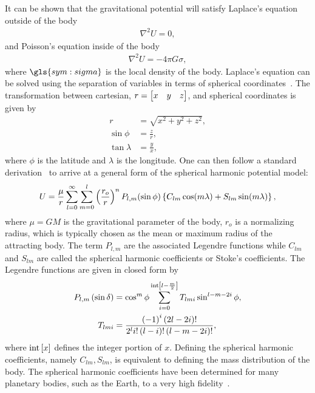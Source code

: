 It can be shown that the gravitational potential will satisfy Laplace's equation outside of the body
\begin{align}\label{eq:laplace_equation}
    \nabla^2 U = 0,
\end{align}
and Poisson's equation inside of the body
\begin{align}\label{eq:poisson_equation}
    \nabla^2 U = - 4 \pi G \sigma,
\end{align}
where \( \gls{sym:sigma} \) is the local density of the body.
Laplace's equation can be solved using the separation of variables in terms of spherical coordinates~\cite{scheeres2012a}.
The transformation between cartesian, \( r = \begin{bmatrix} x & y & z \end{bmatrix}\), and spherical coordinates is given by
\begin{subequations}
    \begin{align*}
        r &= \sqrt{x^2 + y^2 + z^2}, \\
        \sin \phi &= \frac{z}{r}, \\
        \tan \lambda &= \frac{y}{x},
    \end{align*}
\end{subequations}
where \( \phi \) is the latitude and \( \lambda\) is the longitude.
One can then follow a standard derivation~\cite{vallado2007} to arrive at a general form of the spherical harmonic potential model:
\begin{align}\label{eq:spherical_harmonic}
    U = \frac{\mu}{r} \sum_{l=0}^\infty \sum_{m=0}^l \left( \frac{r_o}{r} \right)^n P_{l, m}(\sin \phi) \left\{  C_{lm} \cos(m \lambda) + S_{lm} \sin(m \lambda) \right\},
\end{align}
where \( \mu = G M \) is the gravitational parameter of the body, \( r_o\) is a normalizing radius, which is typically chosen as the mean or maximum radius of the attracting body.
The term \( P_{l, m} \) are the associated Legendre functions while \( C_{lm}\) and \( S_{lm}\) are called the spherical harmonic coefficients or Stoke's coefficients. 
The Legendre functions are given in closed form by~\cite{scheeres2012}
\begin{subequations}
\begin{align}
    P_{l, m} \left(  \sin \delta \right) &= \cos^m \phi \sum_{i = 0}^{\text{int}\left[ l - \frac{m}{2} \right]} T_{lmi} \sin^{l - m - 2i} \phi ,  \\
T_{lmi} &= \frac{\left( -1 \right)^i\left( 2l - 2i \right)!}{2^l i! \left( l - i \right)!\left( l - m- 2i \right)!},
\end{align}
\end{subequations}
where \( \text{int}\left[ x \right]\) defines the integer portion of \( x \).
Defining the spherical harmonic coefficients, namely \( C_{lm}, S_{lm}\), is equivalent to defining the mass distribution of the body.
The spherical harmonic coefficients have been determined for many planetary bodies, such as the Earth, to a very high fidelity~\cite{vallado2007,pavlis2012}.

